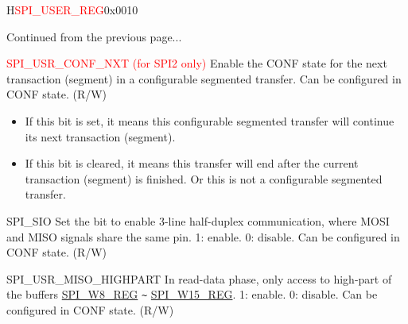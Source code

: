 \addtocounter{Regfloat}{-1}
\begin{register}{H}{\textcolor{red}{SPI\_USER\_REG}}{0x{}0010}
\begin{regdesc}\begin{reglist}
\item [Continued from the previous page...]

\label{fielddesc:SPIUSRCONFNXT}\item [\textcolor{red}{SPI\_USR\_CONF\_NXT (for SPI2 only)}]
Enable the CONF state for the next transaction (segment) in a configurable segmented transfer. Can be configured in CONF state. (R/W)
\begin{itemize}
    \item If this bit is set, it means this configurable segmented transfer will continue its next transaction (segment).
    \item If this bit is cleared, it means this transfer will end after the current transaction (segment) is finished. Or this is not a configurable segmented transfer.
\end{itemize}
\label{fielddesc:SPISIO}\item [SPI\_SIO] Set the bit to enable 3-line half-duplex communication, where MOSI and MISO signals share the same pin. 1: enable. 0: disable. Can be configured in CONF state. (R/W)
\label{fielddesc:SPIUSRMISOHIGHPART}\item [SPI\_USR\_MISO\_HIGHPART] In read-data phase, only access to high-part of the buffers \hyperref[regdesc:SPIW8REG]{SPI\_W8\_REG} \verb+~+ \hyperref[regdesc:SPIW15REG]{SPI\_W15\_REG}. 1: enable. 0: disable. Can be configured in CONF state. (R/W)


\end{reglist}
\end{regdesc}
\end{register}
